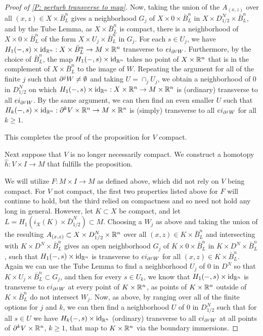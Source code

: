 \begin{proof}[Proof of \cref{P: perturb transverse to map}]
Now, taking the union of the $A_{(x,z)}$ over all $(x,z)\in X\times \bar B^n_L$ gives a neighborhood $G_j$ of $X\times 0\times \bar B^n_L$ in $X\times D_{1/2}^N\times \bar B^n_L$, and by the Tube Lemma, as $X\times \bar B^n_L$ is compact, there is a neighborhood of $X\times 0\times \bar B^n_L$ of the form $X\times U_j\times \bar B^n_L$ in $G_j$. For each $s\in U_j$, we have $H_1(-,s)\times \mathrm{id}_{\mathbb{R}^n}:X\times \bar B^n_L\to M\times \mathbb{R}^n$ transverse to $ei_{\partial^jW}$. Furthermore, by the choice of $\bar B^n_L$, the map $H_1(-,s)\times \mathrm{id}_{\mathbb{R}^n}$ takes no point of $X\times \mathbb{R}^n$ that is in the complement of $X\times \bar B^n_L$ to the image of $W$. Repeating the argument for all of the finite $j$ such that $\partial^jW\neq \emptyset$ and taking $U=\cap_j U_j$, we obtain a neighborhood of $0$ in $D_{1/2}^N$ on which  $H_1(-,s)\times \mathrm{id}_{\mathbb{R}^n}:X\times \mathbb{R}^n\to M\times \mathbb{R}^n$ is (ordinary) transverse to all $ei_{\partial^jW}$. By the same argument,  we can then find an even smaller $U$ such that $H_k(-,s)\times \mathrm{id}_{\mathbb{R}^n}:\partial^{k}V\times \mathbb{R}^n\to M\times \mathbb{R}^n$ is (simply) transverse to all $ei_{\partial^jW}$ for all $k\geq 1$.


This completes the proof of the proposition for $V$ compact.


Next suppose that $V$ is no longer necessarily compact. We construct a homotopy $\hat h:V\times I\to M$ that fulfills the proposition.




We will utilize $F:M\times I\to M$ as defined above, which did not rely on $V$ being compact. For $V$ not compact, the first two properties listed above for $F$ will continue to hold, but the third relied on compactness and so need not hold any long in general.
However, let  $K\subset X$ be compact, and let $L=H_1(i_X(K)\times \bar D_{1/2}^N)\subset M$.
Choosing a $W_j$ as above and taking the union of the resulting $A_{(x,z)}\subset X\times D_{1/2}^N\times \mathbb{R}^n$ over all $(x,z)\in K\times \bar B^n_L$ and intersecting with $K\times D^N\times \bar B^n_L$ gives an open neighborhood $G_j$ of $K\times 0\times \bar B^n_L$ in $K\times D^N\times \bar B^n_L$, such that
 $H_1(-,s)\times \mathrm{id}_{\mathbb{R}^n}$ is transverse to $ei_{\partial^jW}$  for all $(x,z)\in K\times \bar B^n_L$. Again we can use the Tube Lemma to find a neighborhood $U_j$ of $0$ in $D^N$ so that $K\times U_j\times \bar B^n_L \subset G_j$, and then for every $s\in U_k$, we know that $H_1(-,s)\times \mathrm{id}_{\mathbb{R}^n}$ is transverse to $ei_{\partial^jW}$ at every point of $K\times \mathbb{R}^n$, as points of $K\times \mathbb{R}^n$ outside of $K\times \bar B^n_L$ do not intersect $W_j$.  Now, as above, by ranging over all of the finite options for $j$ and $k$,  we can then find a neighborhood $U$ of $0$ in $D^N_{1/2}$ such that for all $s\in U$ we have $H_k(-,s)\times \mathrm{id}_{\mathbb{R}^n}$  (ordinary) transverse to all $ei_{\partial^jW}$ at all points of $\partial^kV\times \mathbb{R}^n$, $k\geq 1$, that map to $K\times \mathbb{R}^n$ via the boundary immersions.


\end{proof}
